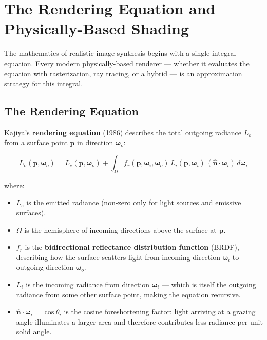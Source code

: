 \documentclass[
  11pt,
  letterpaper,
  DIV=11,
  numbers=noendperiod,
  twoside,
  open=right]{scrreprt}
\providecommand{\tightlist}{%
  \setlength{\itemsep}{0pt}\setlength{\parskip}{0pt}}
\begin{document}
\section{The Rendering Equation and Physically-Based
Shading}\label{the-rendering-equation-and-physically-based-shading}

The mathematics of realistic image synthesis begins with a single
integral equation. Every modern physically-based renderer --- whether it
evaluates the equation with rasterization, ray tracing, or a hybrid ---
is an approximation strategy for this integral.

\subsection{The Rendering Equation}\label{the-rendering-equation}

Kajiya's \textbf{rendering equation} (1986) describes the total outgoing
radiance \(L_o\) from a surface point \(\mathbf{p}\) in direction
\(\boldsymbol{\omega}_o\):

\[
L_o(\mathbf{p}, \boldsymbol{\omega}_o) = L_e(\mathbf{p}, \boldsymbol{\omega}_o) + \int_{\Omega} f_r(\mathbf{p}, \boldsymbol{\omega}_i, \boldsymbol{\omega}_o) \, L_i(\mathbf{p}, \boldsymbol{\omega}_i) \, (\hat{\mathbf{n}} \cdot \boldsymbol{\omega}_i) \, d\boldsymbol{\omega}_i
\]

where:

\begin{itemize}
\tightlist
\item
  \(L_e\) is the emitted radiance (non-zero only for light sources and
  emissive surfaces).
\item
  \(\Omega\) is the hemisphere of incoming directions above the surface
  at \(\mathbf{p}\).
\item
  \(f_r\) is the \textbf{bidirectional reflectance distribution
  function} (BRDF), describing how the surface scatters light from
  incoming direction \(\boldsymbol{\omega}_i\) to outgoing direction
  \(\boldsymbol{\omega}_o\).
\item
  \(L_i\) is the incoming radiance from direction
  \(\boldsymbol{\omega}_i\) --- which is itself the outgoing radiance
  from some other surface point, making the equation recursive.
\item
  \(\hat{\mathbf{n}} \cdot \boldsymbol{\omega}_i = \cos\theta_i\) is the
  cosine foreshortening factor: light arriving at a grazing angle
  illuminates a larger area and therefore contributes less radiance per
  unit solid angle.
\end{itemize}
\end{document}

